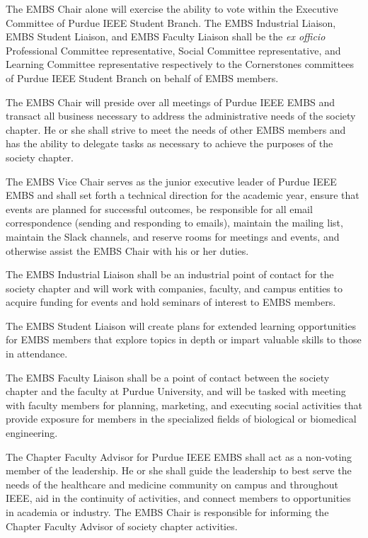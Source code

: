\documentclass[12pt]{constitution}
\begin{document}
The EMBS Chair alone will exercise the ability to vote within the Executive Committee of Purdue IEEE Student Branch. The EMBS Industrial Liaison, EMBS Student Liaison, and EMBS Faculty Liaison shall be the \textit{ex officio} Professional Committee representative, Social Committee representative, and Learning Committee representative respectively to the Cornerstones committees of Purdue IEEE Student Branch on behalf of EMBS members. 

The EMBS Chair will preside over all meetings of Purdue IEEE EMBS and transact all business necessary to address the administrative needs of the society chapter. He or she shall strive to meet the needs of other EMBS members and has the ability to delegate tasks as necessary to achieve the purposes of the society chapter.

The EMBS Vice Chair serves as the junior executive leader of Purdue IEEE EMBS and shall set forth a technical direction for the academic year, ensure that events are planned for successful outcomes, be responsible for all email correspondence (sending and responding to emails), maintain the mailing list, maintain the Slack channels, and reserve rooms for meetings and events, and otherwise assist the EMBS Chair with his or her duties.

The EMBS Industrial Liaison shall be an industrial point of contact for the society chapter and will work with companies, faculty, and campus entities to acquire funding for events and hold seminars of interest to EMBS members.

The EMBS Student Liaison will create plans for extended learning opportunities for EMBS members that explore topics in depth or impart valuable skills to those in attendance.

The EMBS Faculty Liaison shall be a point of contact between the society chapter and the faculty at Purdue University, and will be tasked with meeting with faculty members for planning, marketing, and executing social activities that provide exposure for members in the specialized fields of biological or biomedical engineering.

The Chapter Faculty Advisor for Purdue IEEE EMBS shall act as a non-voting member of the leadership. He or she shall guide the leadership to best serve the needs of the healthcare and medicine community on campus and throughout IEEE, aid in the continuity of activities, and connect members to opportunities in academia or industry. The EMBS Chair is responsible for informing the Chapter Faculty Advisor of society chapter activities.
\end{document}
